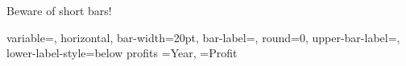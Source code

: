 \documentclass[12pt]{article}
\begin{document}
Beware of short bars! 

\DTLbarchart
{
 variable=\theProfit,
 horizontal,
 bar-width=20pt, 
 bar-label=\theYear,
 round=0,
 upper-bar-label=\DTLbarvalue,
 lower-label-style=below
}
{profits}%
 {%
 \theYear=Year,
 \theProfit=Profit
} 
\end{document}
